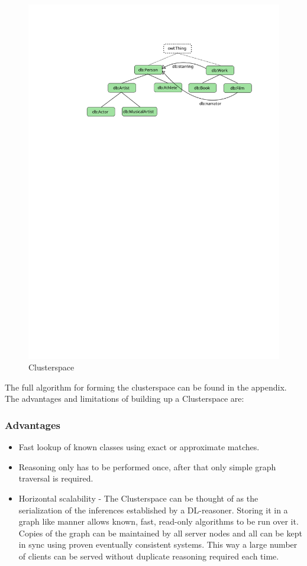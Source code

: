 \documentclass[journal]{IEEEtran}
\begin{document}
\begin{figure}[h]
    \centering
    \includegraphics[scale=0.5]{images/cs}
    \caption{Clusterspace}
    \label{fig:cs}
\end{figure}

The full algorithm for forming the clusterspace can be found in the appendix. %
The advantages and limitations of building up a Clusterspace are:

\subsubsection*{Advantages}
\begin{itemize}
    \item Fast lookup of known classes using exact or approximate matches.
    \item Reasoning only has to be performed once, after that only simple graph
        traversal is required.
    \item Horizontal scalability - The Clusterspace can be thought of as the
        serialization of the inferences established by a DL-reasoner. Storing
        it in a graph like manner allows known, fast, read-only algorithms to
        be run over it. Copies of the graph can be maintained by all server
        nodes and all can be kept in sync using proven eventually consistent
        systems. This way a large number of clients can be served without
        duplicate reasoning required each time.
\end{itemize}
\end{document}
